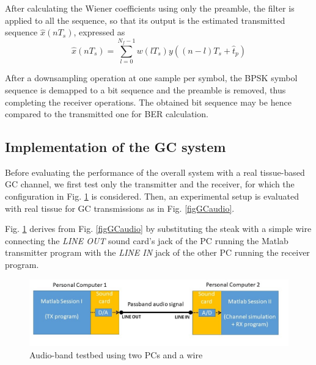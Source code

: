 After calculating the Wiener coefficients using only the preamble, the filter is applied to all the sequence, so that its output is the estimated transmitted sequence $\hat{x}(nT_s)$, expressed as
\begin{equation}
\label{eq_outW}
\hat{x}(nT_s)=\sum_{l=0}^{N_f-1}w(lT_s)y((n-l)T_s+\hat{t}_{p})
\end{equation}












After a downsampling operation at one sample per symbol, the BPSK symbol sequence is demapped to a bit sequence and the preamble is removed, thus completing the receiver operations. The obtained bit sequence may be hence compared to the transmitted one for BER calculation.
 
\subsection{Implementation of the GC system}
\label{Impl}
Before evaluating the performance of the overall system with a real tissue-based GC channel, we first test only the transmitter and the receiver, for which the configuration in Fig. \ref{FigWIRE} is considered. Then, 
an experimental setup is evaluated with real tissue for GC transmissions as in Fig. \ref{figGCaudio}. 

Fig. \ref{FigWIRE} derives from Fig. \ref{figGCaudio} by substituting the steak with a simple wire connecting the \emph{LINE OUT} sound card's jack of the PC running the Matlab transmitter program with the \emph{LINE IN} jack of the other PC running the receiver program.
\begin{figure}
	\includegraphics[width=\textwidth]{figures/GC_testbed/AUDIO_WIRE.jpg}
	\caption{Audio-band testbed using two PCs and a wire} \label{FigWIRE}
\end{figure}

